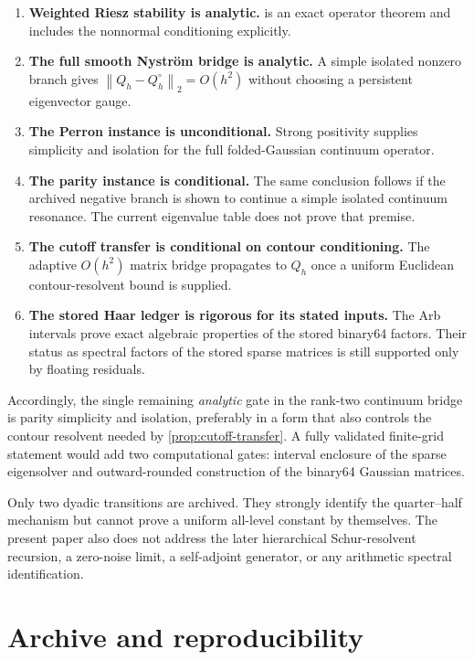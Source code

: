 \documentclass[11pt]{article}
\theoremstyle{definition}
\theoremstyle{remark}
\newcommand{\norm}[1]{\left\lVert #1\right\rVert}
\begin{document}
\begin{enumerate}[leftmargin=2em]
 \item \textbf{Weighted Riesz stability is analytic.}
        is an exact operator theorem and
       includes the nonnormal conditioning explicitly.
 \item \textbf{The full smooth Nystr\"om bridge is analytic.}
       A simple isolated nonzero branch gives
       $\norm{Q_h-Q_h^\circ}_2=O(h^2)$ without choosing a persistent
       eigenvector gauge.
 \item \textbf{The Perron instance is unconditional.}
       Strong positivity supplies simplicity and isolation for the full
       folded-Gaussian continuum operator.
 \item \textbf{The parity instance is conditional.}
       The same conclusion follows if the archived negative branch is shown
       to continue a simple isolated continuum resonance.  The current
       eigenvalue table does not prove that premise.
 \item \textbf{The cutoff transfer is conditional on contour conditioning.}
       The adaptive $O(h^2)$ matrix bridge propagates to $Q_h$ once a uniform
       Euclidean contour-resolvent bound is supplied.
 \item \textbf{The stored Haar ledger is rigorous for its stated inputs.}
       The Arb intervals prove exact algebraic properties of the stored
       binary64 factors.  Their status as spectral factors of the stored
       sparse matrices is still supported only by floating residuals.
\end{enumerate}

Accordingly, the single remaining \emph{analytic} gate in the rank-two
continuum bridge is parity simplicity and isolation, preferably in a form
that also controls the contour resolvent needed by
\cref{prop:cutoff-transfer}.  A fully validated finite-grid statement would
add two computational gates: interval enclosure of the sparse eigensolver
and outward-rounded construction of the binary64 Gaussian matrices.

Only two dyadic transitions are archived.  They strongly identify the
quarter--half mechanism but cannot prove a uniform all-level constant by
themselves.  The present paper also does not address the later hierarchical
Schur-resolvent recursion, a zero-noise limit, a self-adjoint generator, or
any arithmetic spectral identification.

\section{Archive and reproducibility}
\label{sec:archive}
\end{document}
